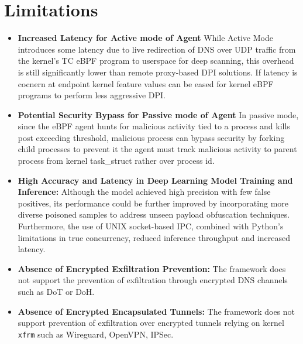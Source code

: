 \documentclass [11pt, proquest] {uwthesis}[2020/02/24]
\begin{document}
\section{Limitations}


\begin{itemize}[nosep]

    \item \textbf{Increased Latency for Active mode of Agent}
     While Active Mode introduces some latency due to live redirection of DNS over UDP traffic from the kernel’s TC eBPF program to userspace for deep scanning, this overhead is still significantly lower than remote proxy-based DPI solutions. If latency is cocnern at endpoint kernel feature values can be eased for kernel eBPF programs to perform less aggressive DPI.

    \item \textbf{Potential Security Bypass for Passive mode of Agent}
    In passive mode, since the eBPF agent hunts for malicious activity tied to a process and kills post exceeding threshold, malicious process can bypass security by forking child processes to prevent it the agent must track malicious activity to parent process from kernel task\_struct rather over process id.

    \item \textbf{High Accuracy and Latency in Deep Learning Model Training and \newline Inference:} Although the model achieved high precision with few false positives, its performance could be further improved by incorporating more diverse poisoned samples to address unseen payload obfuscation techniques. Furthermore, the use of UNIX socket-based IPC, combined with Python's limitations in true concurrency, reduced inference throughput and increased latency.

  \item \textbf{Absence of Encrypted Exfiltration Prevention:} The framework does not support the prevention of exfiltration through encrypted DNS channels such as DoT or DoH.

  \item \textbf{Absence of Encrypted Encapsulated Tunnels:} The framework does not support prevention of exfiltration over encrypted tunnels relying on kernel \texttt{xfrm} such as Wireguard, OpenVPN, IPSec. 

\end{itemize}
\end{document}
